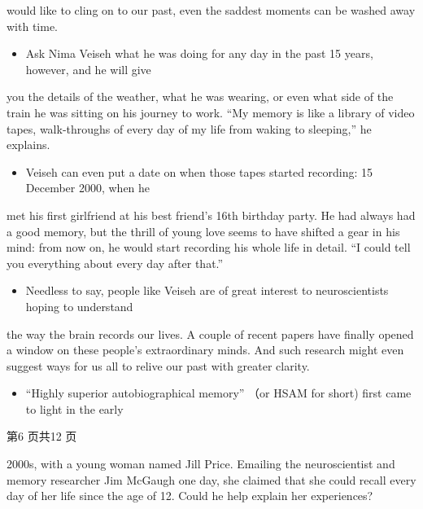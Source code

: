 \documentclass[UTF8,11pt]{ctexart}
\begin{document}
would like to cling on to our past, even the saddest moments can be washed away with time.


\begin{itemize}[leftmargin=2em,itemsep=.2em,topsep=.4em]\item[B.] Ask Nima Veiseh what he was doing for any day in the past 15 years, however, and he will give
\end{itemize}

you the details of the weather, what he was wearing, or even what side of the train he was sitting on his journey to work. “My memory is like a library of video tapes, walk-throughs of every day of my life from waking to sleeping,” he explains.


\begin{itemize}[leftmargin=2em,itemsep=.2em,topsep=.4em]\item[C.] Veiseh can even put a date on when those tapes started recording: 15 December 2000, when he
\end{itemize}

met his first girlfriend at his best friend's 16th birthday party. He had always had a good memory, but the thrill of young love seems to have shifted a gear in his mind: from now on, he would start recording his whole life in detail. “I could tell you everything about every day after that.”


\begin{itemize}[leftmargin=2em,itemsep=.2em,topsep=.4em]\item[D.] Needless to say, people like Veiseh are of great interest to neuroscientists hoping to understand
\end{itemize}

the way the brain records our lives. A couple of recent papers have finally opened a window on these people’s extraordinary minds. And such research might even suggest ways for us all to relive our past with greater clarity.


\begin{itemize}[leftmargin=2em,itemsep=.2em,topsep=.4em]\item[E.] “Highly superior autobiographical memory” （or HSAM for short) first came to light in the early
\end{itemize}

第6 页共12 页


2000s, with a young woman named Jill Price. Emailing the neuroscientist and memory researcher Jim McGaugh one day, she claimed that she could recall every day of her life since the age of 12. Could he help explain her experiences?
\end{document}
